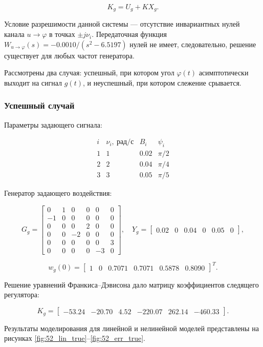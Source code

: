 \documentclass[a4paper,12pt]{article}
\begin{document}
\[
K_g = U_g + K X_g.
\]

Условие разрешимости данной системы — отсутствие инвариантных нулей канала $u \to \varphi$ в точках $\pm j\nu_i$. Передаточная функция $W_{u \to \varphi}(s) = -0.0010/(s^2 - 6.5197)$ нулей не имеет, следовательно, решение существует для любых частот генератора.

Рассмотрены два случая: успешный, при котором угол $\varphi(t)$ асимптотически выходит на сигнал $g(t)$, и неуспешный, при котором слежение срывается.

\subsubsection{Успешный случай}

Параметры задающего сигнала:

\[
\begin{array}{c|c|c|c}
	i & \nu_i,\ \text{рад/с} & B_i & \psi_i \\ \hline
	1 & 1 & 0.02 & \pi/2 \\
	2 & 2 & 0.04 & \pi/4 \\
	3 & 3 & 0.05 & \pi/5
\end{array}
\]

Генератор задающего воздействия:

\[
G_g = \begin{bmatrix}
	0 & 1 & 0 & 0 & 0 & 0 \\
	-1 & 0 & 0 & 0 & 0 & 0 \\
	0 & 0 & 0 & 2 & 0 & 0 \\
	0 & 0 & -2 & 0 & 0 & 0 \\
	0 & 0 & 0 & 0 & 0 & 3 \\
	0 & 0 & 0 & 0 & -3 & 0
\end{bmatrix},
\quad
Y_g = \begin{bmatrix}
	0.02 & 0 & 0.04 & 0 & 0.05 & 0
\end{bmatrix},
\]

\[
w_g(0) = \begin{bmatrix} 1 & 0 & 0.7071 & 0.7071 & 0.5878 & 0.8090 \end{bmatrix}^T.
\]

Решение уравнений Франкиса–Дэвисона дало матрицу коэффициентов следящего регулятора:

\[
K_g = \begin{bmatrix}
	-53.24 & -20.70 & 4.52 & -220.07 & 262.14 & -460.33
\end{bmatrix}.
\]

Результаты моделирования для линейной и нелинейной моделей представлены на рисунках \ref{fig:52_lin_true}--\ref{fig:52_err_true}.
\end{document}
